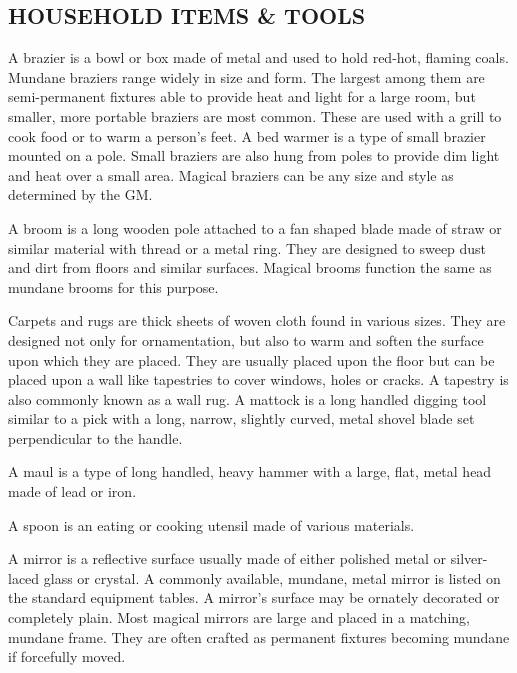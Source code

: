 \begin{multicols}{2}
\subsection{HOUSEHOLD ITEMS \& TOOLS}

A brazier is a bowl or box made of metal and used to hold red-hot, flaming coals.  Mundane braziers range widely in size and form.  The largest among them are semi-permanent fixtures able to provide heat and light for a large room, but smaller, more portable braziers are most common.  These are used with a grill to cook food or to warm a person's feet.  A bed warmer is a type of small brazier mounted on a pole.  Small braziers are also hung from poles to provide dim light and heat over a small area.  Magical braziers can be any size and style as determined by the GM.  
 
A broom is a long wooden pole attached to a fan shaped blade made of straw or similar material with thread or a metal ring.  They are designed to sweep dust and dirt from floors and similar surfaces.  Magical brooms function the same as mundane brooms for this purpose.

Carpets and rugs are thick sheets of woven cloth found in various sizes.  They are designed not only for ornamentation, but also to warm and soften the surface upon which they are placed.  They are usually placed upon the floor but can be placed upon a wall like tapestries to cover windows, holes or cracks.  A tapestry is also commonly known as a wall rug.  
A mattock is a long handled digging tool similar to a pick with a long, narrow, slightly curved, metal shovel blade set perpendicular to the handle.

A maul is a type of long handled, heavy hammer with a large, flat, metal head made of lead or iron.

A spoon is an eating or cooking utensil made of various materials.

A mirror is a reflective surface usually made of either polished metal or silver-laced glass or crystal.  A commonly available, mundane, metal mirror is listed on the standard equipment tables.  A mirror's surface may be ornately decorated or completely plain.  Most magical mirrors are large and placed in a matching, mundane frame.  They are often crafted as permanent fixtures becoming mundane if forcefully moved. 


\end{multicols}
